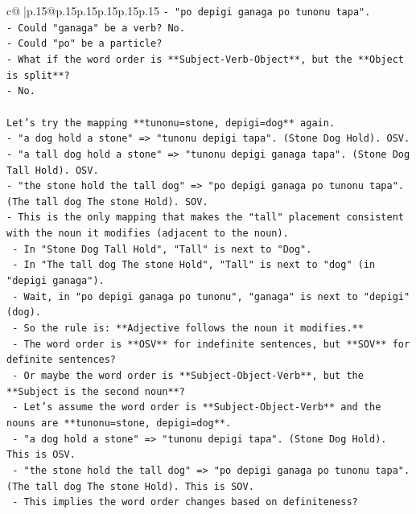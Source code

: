 \documentclass{article}
\begin{document}
{\begin{supertabular}{c@{$\;$}|p{.15\linewidth}@{}p{.15\linewidth}p{.15\linewidth}p{.15\linewidth}p{.15\linewidth}p{.15\linewidth}}
{{{\texttt{{-} "po depigi ganaga po tunonu tapa".} \\
\texttt{{-} Could "ganaga" be a verb? No.} \\
\texttt{{-} Could "po" be a particle?} \\
\texttt{{-} What if the word order is **Subject{-}Verb{-}Object**, but the **Object is split**?} \\
\texttt{{-} No.} \\
\\ 
\texttt{Let's try the mapping **tunonu=stone, depigi=dog** again.} \\
\texttt{{-} "a dog hold a stone" => "tunonu depigi tapa". (Stone Dog Hold). OSV.} \\
\texttt{{-} "a tall dog hold a stone" => "tunonu depigi ganaga tapa". (Stone Dog Tall Hold). OSV.} \\
\texttt{{-} "the stone hold the tall dog" => "po depigi ganaga po tunonu tapa". (The tall dog The stone Hold). SOV.} \\
\texttt{{-} This is the only mapping that makes the "tall" placement consistent with the noun it modifies (adjacent to the noun).} \\
\texttt{  {-} In "Stone Dog Tall Hold", "Tall" is next to "Dog".} \\
\texttt{  {-} In "The tall dog The stone Hold", "Tall" is next to "dog" (in "depigi ganaga").} \\
\texttt{  {-} Wait, in "po depigi ganaga po tunonu", "ganaga" is next to "depigi" (dog).} \\
\texttt{  {-} So the rule is: **Adjective follows the noun it modifies.**} \\
\texttt{  {-} The word order is **OSV** for indefinite sentences, but **SOV** for definite sentences?} \\
\texttt{  {-} Or maybe the word order is **Subject{-}Object{-}Verb**, but the **Subject is the second noun**?} \\
\texttt{  {-} Let's assume the word order is **Subject{-}Object{-}Verb** and the nouns are **tunonu=stone, depigi=dog**.} \\
\texttt{    {-} "a dog hold a stone" => "tunonu depigi tapa". (Stone Dog Hold). This is OSV.} \\
\texttt{    {-} "the stone hold the tall dog" => "po depigi ganaga po tunonu tapa". (The tall dog The stone Hold). This is SOV.} \\
\texttt{  {-} This implies the word order changes based on definiteness?} \\
}}}
\end{supertabular}}
\end{document}
